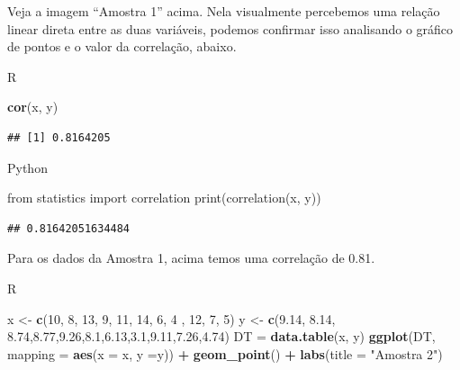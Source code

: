 \documentclass[
]{book}
\newenvironment{Shaded}{\begin{snugshade}}{\end{snugshade}}
\newcommand{\AttributeTok}[1]{\textcolor[rgb]{0.13,0.29,0.53}{#1}}
\newcommand{\BuiltInTok}[1]{#1}
\newcommand{\DecValTok}[1]{\textcolor[rgb]{0.00,0.00,0.81}{#1}}
\newcommand{\FloatTok}[1]{\textcolor[rgb]{0.00,0.00,0.81}{#1}}
\newcommand{\FunctionTok}[1]{\textcolor[rgb]{0.13,0.29,0.53}{\textbf{#1}}}
\newcommand{\ImportTok}[1]{#1}
\newcommand{\NormalTok}[1]{#1}
\newcommand{\OtherTok}[1]{\textcolor[rgb]{0.56,0.35,0.01}{#1}}
\newcommand{\SpecialCharTok}[1]{\textcolor[rgb]{0.81,0.36,0.00}{\textbf{#1}}}
\newcommand{\StringTok}[1]{\textcolor[rgb]{0.31,0.60,0.02}{#1}}
\begin{document}
Veja a imagem ``Amostra 1'' acima. Nela visualmente percebemos uma relação linear direta entre as duas variáveis, podemos confirmar isso analisando o gráfico de pontos e o valor da correlação, abaixo.

R

\begin{Shaded}
\begin{Highlighting}[]
\FunctionTok{cor}\NormalTok{(x, y)  }
\end{Highlighting}
\end{Shaded}

\begin{verbatim}
## [1] 0.8164205
\end{verbatim}

Python

\begin{Shaded}
\begin{Highlighting}[]
\ImportTok{from}\NormalTok{ statistics }\ImportTok{import}\NormalTok{ correlation}
\BuiltInTok{print}\NormalTok{(correlation(x, y))}
\end{Highlighting}
\end{Shaded}

\begin{verbatim}
## 0.81642051634484
\end{verbatim}

Para os dados da Amostra 1, acima temos uma correlação de 0.81.

R

\begin{Shaded}
\begin{Highlighting}[]
\NormalTok{x }\OtherTok{\textless{}{-}} \FunctionTok{c}\NormalTok{(}\DecValTok{10}\NormalTok{, }\DecValTok{8}\NormalTok{, }\DecValTok{13}\NormalTok{, }\DecValTok{9}\NormalTok{, }\DecValTok{11}\NormalTok{, }\DecValTok{14}\NormalTok{, }\DecValTok{6}\NormalTok{, }\DecValTok{4}\NormalTok{ , }\DecValTok{12}\NormalTok{, }\DecValTok{7}\NormalTok{, }\DecValTok{5}\NormalTok{)}
\NormalTok{y }\OtherTok{\textless{}{-}} \FunctionTok{c}\NormalTok{(}\FloatTok{9.14}\NormalTok{, }\FloatTok{8.14}\NormalTok{, }\FloatTok{8.74}\NormalTok{,}\FloatTok{8.77}\NormalTok{,}\FloatTok{9.26}\NormalTok{,}\FloatTok{8.1}\NormalTok{,}\FloatTok{6.13}\NormalTok{,}\FloatTok{3.1}\NormalTok{,}\FloatTok{9.11}\NormalTok{,}\FloatTok{7.26}\NormalTok{,}\FloatTok{4.74}\NormalTok{)}
\NormalTok{DT }\OtherTok{=} \FunctionTok{data.table}\NormalTok{(x, y)}
\FunctionTok{ggplot}\NormalTok{(DT, }\AttributeTok{mapping =} \FunctionTok{aes}\NormalTok{(}\AttributeTok{x =}\NormalTok{ x, }\AttributeTok{y =}\NormalTok{y)) }\SpecialCharTok{+}
  \FunctionTok{geom\_point}\NormalTok{() }\SpecialCharTok{+}
  \FunctionTok{labs}\NormalTok{(}\AttributeTok{title =} \StringTok{"Amostra 2"}\NormalTok{)}
\end{Highlighting}
\end{Shaded}
\end{document}

